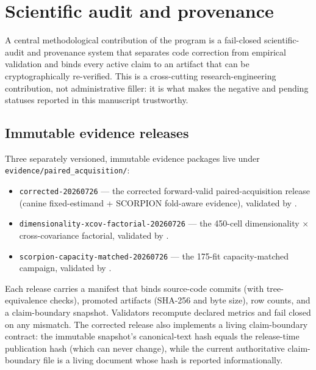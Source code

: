 \section{Scientific audit and provenance}


A central methodological contribution of the program is a fail-closed
scientific-audit and provenance system that separates code correction from
empirical validation and binds every active claim to an artifact that can be
cryptographically re-verified. This is a cross-cutting research-engineering
contribution, not administrative filler: it is what makes the negative and
pending statuses reported in this manuscript trustworthy.

\subsection{Immutable evidence releases}

Three separately versioned, immutable evidence packages live under
\texttt{evidence/paired\_acquisition/}:

\begin{itemize}
\item \texttt{corrected-20260726} --- the corrected forward-valid
  paired-acquisition release (canine fixed-estimand + SCORPION fold-aware
  evidence), validated by \texttt{}.
\item \texttt{dimensionality-xcov-factorial-20260726} --- the 450-cell
  dimensionality $\times$ cross-covariance factorial, validated by
  \texttt{}.
\item \texttt{scorpion-capacity-matched-20260726} --- the 175-fit capacity-matched
  campaign, validated by \texttt{}.
\end{itemize}

Each release carries a manifest that binds source-code commits (with
tree-equivalence checks), promoted artifacts (SHA-256 and byte size), row counts,
and a claim-boundary snapshot. Validators recompute declared metrics and fail
closed on any mismatch. The corrected release also implements a living
claim-boundary contract: the immutable snapshot's canonical-text hash equals the
release-time publication hash (which can never change), while the current
authoritative claim-boundary file is a living document whose hash is reported
informationally.


